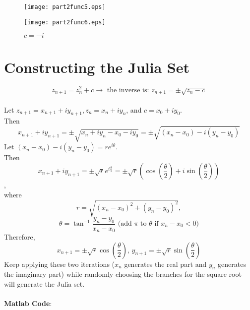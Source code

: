 \documentclass[11pt]{article}
\begin{document}
   \begin{figure}[!h]
  \begin{minipage}[b]{0.45\textwidth}
    \texttt{[image: part2func5.eps]}
    \caption{$c = -1$}
  \end{minipage}
  \hfill
  \begin{minipage}[b]{0.45\textwidth}
    \texttt{[image: part2func6.eps]}
    \caption{$c = -i$}
  \end{minipage}

\end{figure}

\section{Constructing the Julia Set}
$$z_{n+1} = z_n^2 +c\rightarrow \textrm{ the inverse is: }z_{n+1} = \pm\sqrt{z_{n}-c}$$\\
Let $z_{n+1} = x_{n+1} + iy_{n+1}, z_n = x_n + iy_n$, and $c = x_0 + iy_0$.\\
Then $$x_{n+1}+iy_{n+1} = \pm\sqrt{x_n+iy_n-x_0-iy_0} = \pm\sqrt{(x_n-x_0)-i(y_n-y_0)} $$
Let $(x_n-x_0)-i(y_n-y_0) = re^{i\theta}$.\\
Then $$x_{n+1}+iy_{n+1} =\pm \sqrt{r}e^{i\frac{\theta}{2}} = \pm\sqrt{r}(\cos(\frac{\theta}{2})+i\sin(\frac{\theta}{2}))$$,\\
where $$r = \sqrt{(x_n-x_0)^2 + (y_n-y_0)^2},$$$$ \theta = \tan^{-1}{\frac{y_n-y_0}{x_n-x_0}}\textrm{  (add $\pi$ to $\theta$ if $x_n-x_0 < 0$)}$$
Therefore, $$x_{n+1} = \pm\sqrt{r}\cos(\frac{\theta}{2}) \textrm{, }y_{n+1} = \pm\sqrt{r}\sin(\frac{\theta}{2})$$
Keep applying these two iterations ($x_n$ generates the real part and $y_n$ generates the imaginary part) while randomly choosing the branches for the square root will generate the Julia set.\\
\\
\textbf{Matlab Code}:
\end{document}

